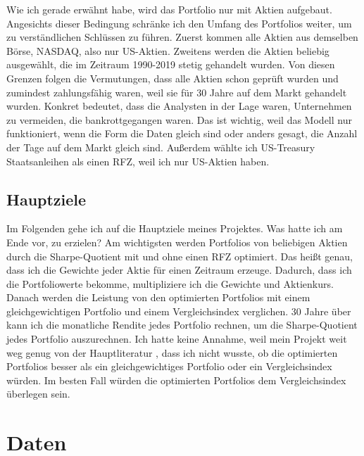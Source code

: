 \documentclass[12pt]{article}
\begin{document}
            Wie ich gerade erwähnt habe, wird das Portfolio nur mit Aktien aufgebaut. 
            Angesichts dieser Bedingung schränke ich den Umfang des Portfolios weiter, 
            um zu verständlichen Schlüssen zu führen. Zuerst kommen alle Aktien aus demselben Börse, NASDAQ, also nur US-Aktien. 
            Zweitens werden die Aktien beliebig ausgewählt, die im Zeitraum 1990-2019 stetig gehandelt wurden. 
            Von diesen Grenzen folgen die Vermutungen, dass alle Aktien schon geprüft wurden und zumindest zahlungsfähig waren,
            weil sie für 30 Jahre auf dem Markt gehandelt wurden. 
            Konkret bedeutet, dass die Analysten in der Lage waren, Unternehmen zu vermeiden, die bankrottgegangen waren. 
            Das ist wichtig, weil das Modell nur funktioniert, wenn die Form die Daten gleich sind oder anders gesagt, 
            die Anzahl der Tage auf dem Markt gleich sind. Außerdem wählte ich US-Treasury Staatsanleihen als einen RFZ, 
            weil ich nur US-Aktien haben.
        
        \subsection{Hauptziele}
        
            Im Folgenden gehe ich auf die Hauptziele meines Projektes. 
            Was hatte ich am Ende vor, zu erzielen? 
            Am wichtigsten werden Portfolios von beliebigen Aktien durch die Sharpe-Quotient mit und
            ohne einen RFZ optimiert. Das heißt genau, dass ich die Gewichte jeder Aktie für einen Zeitraum erzeuge. 
            Dadurch, dass ich die Portfoliowerte bekomme, multipliziere ich die Gewichte und Aktienkurs. 
            Danach werden die Leistung von den optimierten Portfolios mit einem gleichgewichtigen Portfolio und 
            einem Vergleichsindex verglichen. 30 Jahre über kann ich die monatliche Rendite jedes Portfolio rechnen, 
            um die Sharpe-Quotient jedes Portfolio auszurechnen. 
            Ich hatte keine Annahme, weil mein Projekt weit weg genug von der Hauptliteratur \cite{zhang2020}, 
            dass ich nicht wusste, ob die optimierten Portfolios besser als ein gleichgewichtiges Portfolio oder 
            ein Vergleichsindex würden. Im besten Fall würden die optimierten Portfolios dem Vergleichsindex überlegen sein.

    \section{Daten}
            
\end{document}
